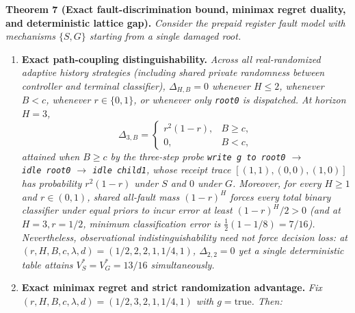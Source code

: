 \documentclass[11pt,a4paper]{article}
\providecommand{\tightlist}{\setlength{\itemsep}{2pt}\setlength{\parskip}{0pt}}
\begin{document}
\textbf{Theorem 7 (Exact fault-discrimination bound, minimax regret
duality, and deterministic lattice gap).} \emph{Consider the prepaid
register fault model with mechanisms \(\{S, G\}\) starting from a single
damaged root.}

\begin{enumerate}
\def\labelenumi{\arabic{enumi}.}
\tightlist
\item
  \textbf{Exact path-coupling distinguishability.} \emph{Across all
  real-randomized adaptive history strategies (including shared private
  randomness between controller and terminal classifier),
  \(\Delta_{H,B} = 0\) whenever \(H \le 2\), whenever \(B < c\),
  whenever \(r \in \{0,1\}\), or whenever only \texttt{root0} is
  dispatched. At horizon \(H = 3\),}
  \[\Delta_{3,B} = \begin{cases} r^2(1 - r), & B \ge c, \\ 0, & B < c, \end{cases}\]
  \emph{attained when \(B \ge c\) by the three-step probe
  \texttt{write\ g\ to\ root0} \(\to\) \texttt{idle\ root0} \(\to\)
  \texttt{idle\ child1}, whose receipt trace \([(1,1), (0,0), (1,0)]\)
  has probability \(r^2(1-r)\) under \(S\) and \(0\) under \(G\).
  Moreover, for every \(H \ge 1\) and \(r \in (0,1)\), shared all-fault
  mass \((1-r)^H\) forces every total binary classifier under equal
  priors to incur error at least \((1-r)^H / 2 > 0\) (and at
  \(H=3, r=1/2\), minimum classification error is
  \(\frac{1}{2}(1 - 1/8) = 7/16\)). Nevertheless, observational
  indistinguishability need not force decision loss: at
  \((r, H, B, c, \lambda, d) = (1/2, 2, 2, 1, 1/4, 1)\),
  \(\Delta_{2,2} = 0\) yet a single deterministic table attains
  \(V_S^* = V_G^* = 13/16\) simultaneously.}
\item
  \textbf{Exact minimax regret and strict randomization advantage.}
  \emph{Fix \((r, H, B, c, \lambda, d) = (1/2, 3, 2, 1, 1/4, 1)\) with
  \(g = \mathrm{true}\). Then:}


\end{enumerate}
\end{document}
